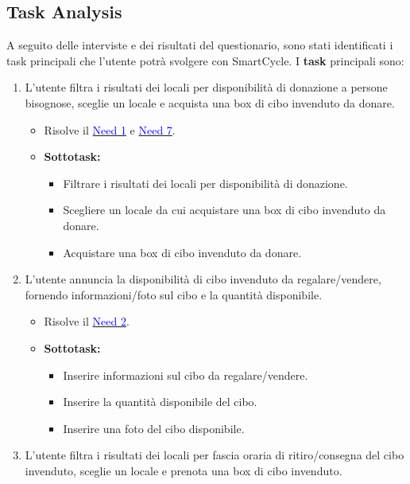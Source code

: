 \documentclass{article}
\begin{document}
\subsection{Task Analysis}
A seguito delle interviste e dei risultati del questionario, sono stati identificati i task principali che l'utente potrà svolgere con SmartCycle.
\newline
I \textbf{task} principali sono:
\begin{enumerate}[label=\textbf{Task-\arabic*}]
    \item L'utente filtra i risultati dei locali per disponibilità di donazione a persone bisognose, sceglie un locale e acquista una box di cibo invenduto da donare.
    \begin{itemize}
        \item Risolve il \hyperref[need1]{\textcolor{blue}{Need 1}} e \hyperref[need7]{\textcolor{blue}{Need 7}}.
        \item \textbf{Sottotask:} 
        \begin{itemize}
            \item Filtrare i risultati dei locali per disponibilità di donazione.
            \item Scegliere un locale da cui acquistare una box di cibo invenduto da donare.
            \item Acquistare una box di cibo invenduto da donare.
        \end{itemize}
    \end{itemize}
    \item L'utente annuncia la disponibilità di cibo invenduto da regalare/vendere, fornendo informazioni/foto sul cibo e la quantità disponibile.
    \begin{itemize}
        \item Risolve il \hyperref[need2]{\textcolor{blue}{Need 2}}.
        \item \textbf{Sottotask:} 
        \begin{itemize}
            \item Inserire informazioni sul cibo da regalare/vendere.
            \item Inserire la quantità disponibile del cibo.
            \item Inserire una foto del cibo disponibile.
        \end{itemize}
    \end{itemize}
    \item L'utente filtra i risultati dei locali per fascia oraria di ritiro/consegna del cibo invenduto, sceglie un locale e prenota una box di cibo invenduto.

\end{enumerate}
\end{document}
